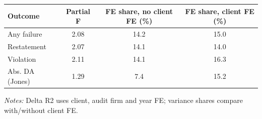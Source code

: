 \documentclass[10pt]{article}
\begin{document}
\begin{minipage}{19cm}\fontsize{10}{12}\selectfont\setlength{\tabcolsep}{4pt}\renewcommand{\arraystretch}{1.12}


\centering
{}
\begin{threeparttable}
\begin{tabular}{p{}ccc}
\toprule
Outcome & Partial F & FE share, no client FE (\%) & FE share, client FE (\%) \\
\midrule
Any failure & 2.08 & 14.2 & 15.0 \\
Restatement & 2.07 & 14.1 & 14.0 \\
Violation & 2.11 & 14.1 & 16.3 \\
Abs. DA (Jones) & 1.29 & 7.4 & 15.2 \\
\bottomrule
\end{tabular}
\begin{tablenotes}\fontsize{9}{11}\selectfont
\item \raggedright \fontsize{9}{11}\selectfont \textit{Notes:} Delta R2 uses client, audit firm and year FE; variance shares compare with/without client FE.
\end{tablenotes}
\end{threeparttable}

\end{minipage}
\end{document}
